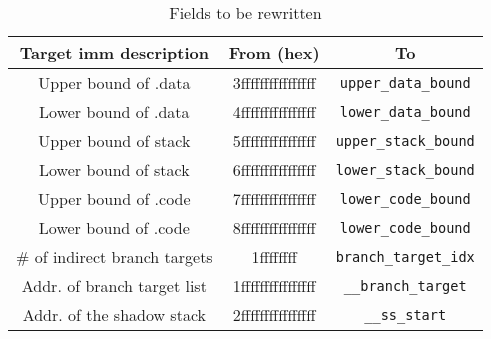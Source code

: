 \begin{table}[htbp]
\footnotesize
\caption{Fields to be rewritten}\label{tb-rewritter}
\vspace{-5pt}
\begin{center}
\begin{tabular}{|c|c|c|}
\hline
\textbf{Target imm description} & \textbf{From} (hex) & \textbf{To} \\
\hline
Upper bound of .data & 3ffffffffffffffff & \verb|upper_data_bound| \\
\hline
Lower bound of .data & 4ffffffffffffffff & \verb|lower_data_bound| \\
\hline
Upper bound of stack & 5ffffffffffffffff & \verb|upper_stack_bound| \\
\hline
Lower bound of stack & 6ffffffffffffffff & \verb|lower_stack_bound| \\
\hline
Upper bound of .code & 7ffffffffffffffff & \verb|lower_code_bound| \\
\hline
Lower bound of .code & 8ffffffffffffffff & \verb|lower_code_bound| \\
\hline
\# of indirect branch targets & 1ffffffff & \verb|branch_target_idx| \\
\hline
Addr. of branch target list & 1ffffffffffffffff & \verb|__branch_target| \\
\hline
Addr. of the shadow stack & 2ffffffffffffffff & \verb|__ss_start| \\
\hline
\end{tabular}
\end{center}
\vspace{-15pt}
\end{table}